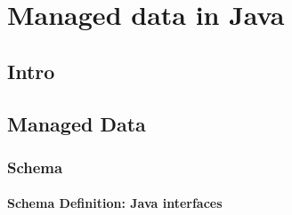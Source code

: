 



\chapter{Managed data in Java}\label{Implementation}
\section{Intro}\label{sec:Intro Implementation}

\section{Managed Data}\label{sec:Managed Data Implementation}

\subsection{Schema}\label{subsec:Schema Implementation}

\subsubsection{Schema Definition: Java interfaces}\label{Schema Definition: Java interfaces}

